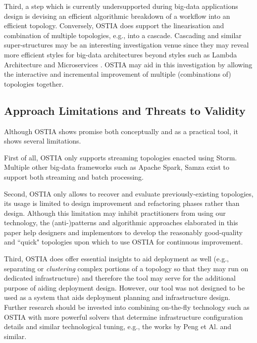 Third, a step which is currently undersupported during big-data applications design is devising an efficient algorithmic breakdown of a workflow into an efficient topology. Conversely, OSTIA does support the linearisation and combination of multiple topologies, e.g., into a cascade. Cascading and similar super-structures may be an interesting investigation venue since they may reveal more efficient styles for big-data architectures beyond styles such as Lambda Architecture \cite{lambda} and Microservices \cite{balalaie2016microservices}. OSTIA may aid in this investigation by allowing the interactive and incremental improvement of multiple (combinations of) topologies together.

\subsection{Approach Limitations and Threats to Validity}\label{lim}

Although OSTIA shows promise both conceptually and as a practical tool, it shows several limitations.

First of all, OSTIA only supports streaming topologies enacted using Storm. Multiple other big-data frameworks such as Apache Spark, Samza exist to support both streaming and batch processing. 

Second, OSTIA only allows to recover and evaluate previously-existing topologies, its usage is limited to design improvement and refactoring phases rather than design. Although this limitation may inhibit practitioners from using our technology, the (anti-)patterns and algorithmic approaches elaborated in this paper help designers and implementors to develop the reasonably good-quality and ``quick" topologies upon which to use OSTIA for continuous improvement.

Third, OSTIA does offer essential insights to aid deployment as well (e.g., separating or \emph{clustering} complex portions of a topology so that they may run on dedicated infrastructure) and therefore the tool may serve for the additional purpose of aiding deployment design. However, our tool was not designed to be used as a system that aids deployment planning and infrastructure design. Further research should be invested into combining on-the-fly technology such as OSTIA with more powerful solvers that determine infrastructure configuration details and similar technological tuning, e.g., the works by Peng et Al. \cite{PengGWRYC14} and similar.

